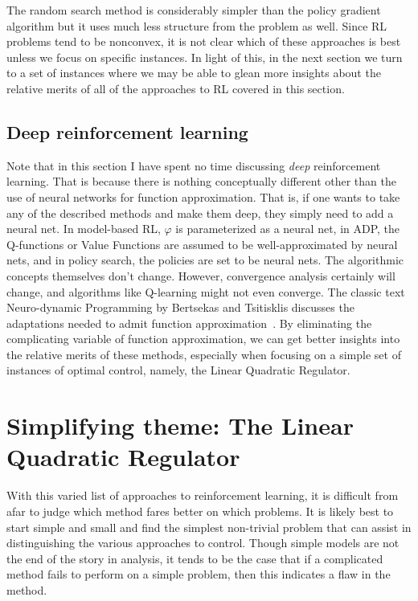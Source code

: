 \documentclass[11pt]{article}
\numberwithin{equation}{section}
\begin{document}
The random search method is considerably simpler than the policy gradient algorithm but it uses much less structure from the problem as well.  Since RL problems tend to be nonconvex, it is not clear which of these approaches is best unless we focus on specific instances. In light of this, in the next section we turn to a set of instances where we may be able to glean more insights about the relative merits of all of the approaches to RL covered in this section.

\subsection{Deep reinforcement learning}

Note that in this section I have spent no time discussing \emph{deep} reinforcement learning. That is because there is nothing conceptually different other than the use of neural networks for function approximation. That is, if one wants to take any of the described methods and make them deep, they simply need to add a neural net. In model-based RL, $\varphi$ is parameterized as a neural net, in ADP, the Q-functions or Value Functions are assumed to be well-approximated by neural nets, and in policy search, the policies are set to be neural nets. The algorithmic concepts themselves don't change. However, convergence analysis certainly will change, and algorithms like Q-learning might not even converge. The classic text Neuro-dynamic Programming by Bertsekas and Tsitisklis discusses the adaptations needed to admit function approximation~\cite{bertsekas1996neuro}. By eliminating the complicating variable of function approximation, we can get better insights into the relative merits of these methods, especially when focusing on a simple set of instances of optimal control, namely, the Linear Quadratic Regulator.

\section{Simplifying theme: The Linear Quadratic Regulator}

With this varied list of approaches to reinforcement learning, it is difficult from afar to judge which method fares better on which problems. It is likely best to start simple and small and find the simplest non-trivial problem that can assist in distinguishing the various approaches to control.  Though simple models are not the end of the story in analysis, it tends to be the case that if a complicated method fails to perform on a simple problem, then this indicates a flaw in the method.
\end{document}
